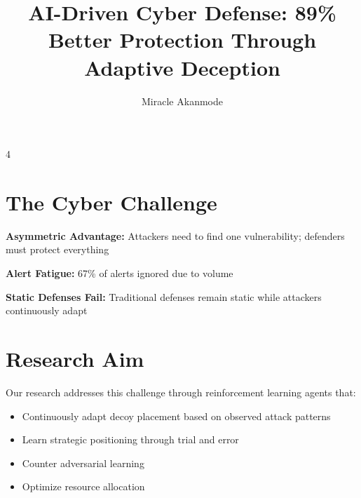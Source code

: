 \documentclass[a0,landscape]{ImperialPoster}
\title{AI-Driven Cyber Defense: 89\% Better Protection Through Adaptive Deception}
\author{Miracle Akanmode}
\newcommand{\alertignored}{67\%}
\begin{document}
\titlesection

\begin{multicols}{4}

\section{The Cyber Challenge}

\textbf{Asymmetric Advantage:} Attackers need to find one vulnerability; defenders must protect everything

\textbf{Alert Fatigue:} \alertignored{} of alerts ignored due to volume

\textbf{Static Defenses Fail:} Traditional defenses remain static while attackers continuously adapt

\begin{center}
\end{center}

\section{Research Aim}

Our research addresses this challenge through reinforcement learning agents that:

\begin{itemize}
\item Continuously adapt decoy placement based on observed attack patterns
\item Learn strategic positioning through trial and error
\item Counter adversarial learning
\item Optimize resource allocation
\end{itemize}


\end{multicols}
\end{document}

